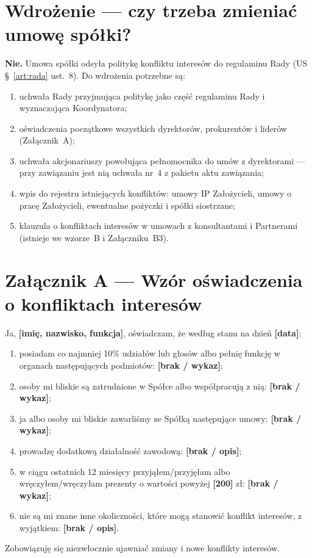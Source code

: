 \documentclass[11pt,a4paper]{report}
\newcommand{\field}[1]{\textbf{[#1]}}
\newcommand{\US}[1]{US §~#1}
\begin{document}
\section{Wdrożenie --- czy trzeba zmieniać umowę spółki?}

\textbf{Nie.} Umowa spółki odsyła politykę konfliktu interesów do regulaminu Rady (\US{\ref{art:rada} ust.~8}). Do wdrożenia potrzebne są:
\begin{enumerate}
  \item uchwała Rady przyjmująca politykę jako część regulaminu Rady i wyznaczająca Koordynatora;
  \item oświadczenia początkowe wszystkich dyrektorów, prokurentów i liderów (Załącznik~A);
  \item uchwała akcjonariuszy powołująca pełnomocnika do umów z dyrektorami --- przy zawiązaniu jest nią uchwała nr~4 z pakietu aktu zawiązania;
  \item wpis do rejestru istniejących konfliktów: umowy IP Założycieli, umowy o pracę Założycieli, ewentualne pożyczki i spółki siostrzane;
  \item klauzula o konfliktach interesów w umowach z konsultantami i Partnerami (istnieje we wzorze~B i Załączniku~B3).
\end{enumerate}

\section*{Załącznik A --- Wzór oświadczenia o konfliktach interesów}

Ja, \field{imię, nazwisko, funkcja}, oświadczam, że według stanu na dzień \field{data}:
\begin{enumerate}
  \item posiadam co najmniej 10\% udziałów lub głosów albo pełnię funkcję w organach następujących podmiotów: \field{brak / wykaz};
  \item osoby mi bliskie są zatrudnione w Spółce albo współpracują z nią: \field{brak / wykaz};
  \item ja albo osoby mi bliskie zawarliśmy ze Spółką następujące umowy: \field{brak / wykaz};
  \item prowadzę dodatkową działalność zawodową: \field{brak / opis};
  \item w ciągu ostatnich 12 miesięcy przyjąłem/przyjęłam albo wręczyłem/wręczyłam prezenty o wartości powyżej \field{200} zł: \field{brak / wykaz};
  \item nie są mi znane inne okoliczności, które mogą stanowić konflikt interesów, z wyjątkiem: \field{brak / opis}.
\end{enumerate}
Zobowiązuję się niezwłocznie ujawniać zmiany i nowe konflikty interesów.
\end{document}
